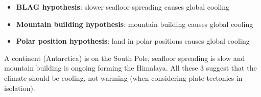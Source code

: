 \begin{itemize}
    \item \textbf{BLAG hypothesis}: slower seafloor spreading causes global
    cooling
    \item \textbf{Mountain building hypothesis}: mountain building causes
    global cooling
    \item \textbf{Polar position hypothesis}: land in polar positions causes
    global cooling
\end{itemize}

A continent (Antarctica) is on the South Pole, seafloor spreading is slow and
mountain building is ongoing forming the Himalaya. All these 3 suggest that the
climate should be cooling, not warming (when considering plate tectonics in
isolation).

